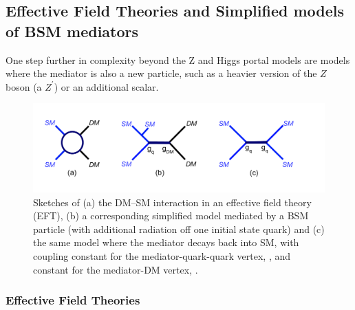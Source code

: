 

\subsection{Effective Field Theories and Simplified models of BSM mediators}
\label{sec:BSMMediatorModels}

One step further in complexity beyond the Z and Higgs portal models are models where the mediator is also a new particle, such as a heavier version of the $Z$ boson (a $Z^\prime$) or an additional scalar.


\begin{figure}[!htpb]
\includegraphics[width=\textwidth]{figures/MonoX.pdf}
\caption{Sketches of (a) the DM--SM interaction in an effective field theory (EFT), (b) a corresponding simplified model mediated by a BSM particle (with additional radiation off one initial state quark) and (c) the same model where the mediator decays back into SM, with coupling constant for the mediator-quark-quark vertex, \gq, and constant for the mediator-DM vertex, \gdm.}%
\label{fig:monoX}
\end{figure}



\subsubsection{Effective Field Theories}
\label{sub:EFT}

